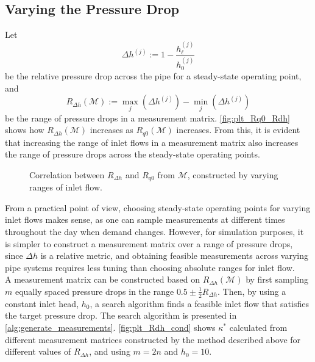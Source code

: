 \subsection{Varying the Pressure Drop}
Let
\begin{equation}
\label{eq:press_drop}
    \Delta h^{(j)} := 1-\dfrac{h_{\ell}^{(j)}}{h_0^{(j)}}
\end{equation}
be the relative pressure drop across the pipe for a steady-state operating point, and
\begin{equation*}
    R_{\Delta h}(\mathcal{M}) := \underset{j}{\max}(\Delta h^{(j)})-\underset{j}{\min}(\Delta h^{(j)})
\end{equation*}
be the range of pressure drops in a measurement matrix. \autoref{fig:plt_Rq0_Rdh} shows how $R_{\Delta h}(\mathcal{M})$ increases as $R_{q0}(\mathcal{M})$ increases. From this, it is evident that increasing the range of inlet flows in a measurement matrix also increases the range of pressure drops across the steady-state operating points.\\

\begin{figure}[ht]
    \centering
    
    \caption[Correlation between $R_{\Delta h}$ and $R_{q0}$]{Correlation between $R_{\Delta h}$ and $R_{q0}$ from $\mathcal{M}$, constructed by varying ranges of inlet flow.}
    \label{fig:plt_Rq0_Rdh}
\end{figure}

From a practical point of view, choosing steady-state operating points for varying inlet flows makes sense, as one can sample measurements at different times throughout the day when demand changes. However, for simulation purposes, it is simpler to construct a measurement matrix over a range of pressure drops, since $\Delta h$ is a relative metric, and obtaining feasible measurements across varying pipe systems requires less tuning than choosing absolute ranges for inlet flow.\\

A measurement matrix can be constructed based on $R_{\Delta h}(\mathcal{M})$ by first sampling $m$ equally spaced pressure drops in the range $0.5\pm\frac{1}{2}R_{\Delta h}$. Then, by using a constant inlet head, $h_0$, a search algorithm finds a feasible inlet flow that satisfies the target pressure drop. The search algorithm is presented in \autoref{alg:generate_measurements}. \autoref{fig:plt_Rdh_cond} shows $\kappa^*$ calculated from different measurement matrices constructed by the method described above for different values of $R_{\Delta h}$, and using $m=2n$ and $h_0=10$.


